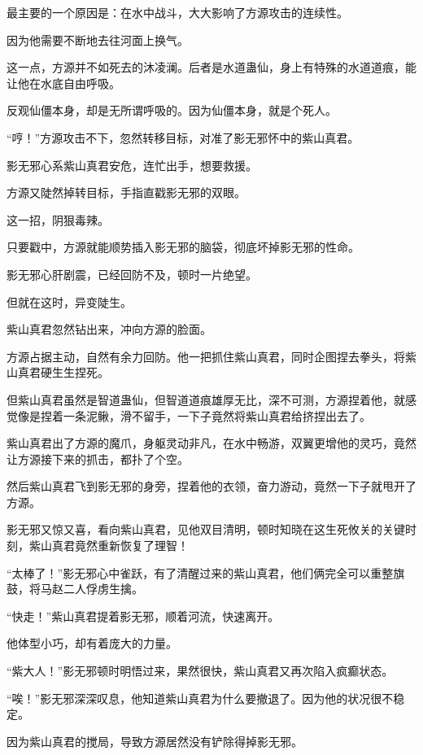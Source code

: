 
\begin{this_body}

最主要的一个原因是：在水中战斗，大大影响了方源攻击的连续性。

因为他需要不断地去往河面上换气。

这一点，方源并不如死去的沐凌澜。后者是水道蛊仙，身上有特殊的水道道痕，能让他在水底自由呼吸。

反观仙僵本身，却是无所谓呼吸的。因为仙僵本身，就是个死人。

“哼！”方源攻击不下，忽然转移目标，对准了影无邪怀中的紫山真君。

影无邪心系紫山真君安危，连忙出手，想要救援。

方源又陡然掉转目标，手指直戳影无邪的双眼。

这一招，阴狠毒辣。

只要戳中，方源就能顺势插入影无邪的脑袋，彻底坏掉影无邪的性命。

影无邪心肝剧震，已经回防不及，顿时一片绝望。

但就在这时，异变陡生。

紫山真君忽然钻出来，冲向方源的脸面。

方源占据主动，自然有余力回防。他一把抓住紫山真君，同时企图捏去拳头，将紫山真君硬生生捏死。

但紫山真君虽然是智道蛊仙，但智道道痕雄厚无比，深不可测，方源捏着他，就感觉像是捏着一条泥鳅，滑不留手，一下子竟然将紫山真君给挤捏出去了。

紫山真君出了方源的魔爪，身躯灵动非凡，在水中畅游，双翼更增他的灵巧，竟然让方源接下来的抓击，都扑了个空。

然后紫山真君飞到影无邪的身旁，捏着他的衣领，奋力游动，竟然一下子就甩开了方源。

影无邪又惊又喜，看向紫山真君，见他双目清明，顿时知晓在这生死攸关的关键时刻，紫山真君竟然重新恢复了理智！

“太棒了！”影无邪心中雀跃，有了清醒过来的紫山真君，他们俩完全可以重整旗鼓，将马赵二人俘虏生擒。

“快走！”紫山真君提着影无邪，顺着河流，快速离开。

他体型小巧，却有着庞大的力量。

“紫大人！”影无邪顿时明悟过来，果然很快，紫山真君又再次陷入疯癫状态。

“唉！”影无邪深深叹息，他知道紫山真君为什么要撤退了。因为他的状况很不稳定。

因为紫山真君的搅局，导致方源居然没有铲除得掉影无邪。


\end{this_body}
